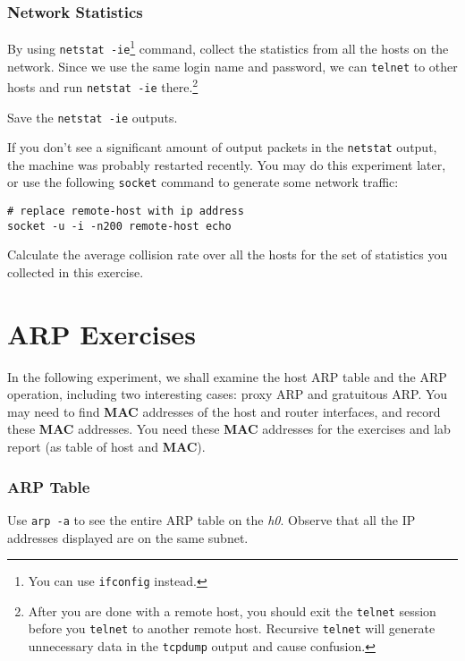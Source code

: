 \documentclass{../UTNetLab}
\begin{document}
\section{Network Statistics}
    By using \lstinline{netstat -ie}\footnote{You can use \lstinline{ifconfig} instead.} command, collect the statistics from all the hosts on the network.
    Since we use the same login name and password, we can \lstinline{telnet} to other hosts and run \lstinline{netstat -ie} there.\footnote{%
    After you are done with a remote host, you should exit the \lstinline{telnet} session before you \lstinline{telnet} to another remote host.
    Recursive \lstinline{telnet} will generate unnecessary data in the \lstinline{tcpdump} output and cause confusion.
    }

    Save the \lstinline{netstat -ie} outputs.

    If you don’t see a significant amount of output packets in the \lstinline{netstat} output, the machine was probably restarted recently.
    You may do this experiment later, or use the following \lstinline{socket} command to generate some network traffic:
    \begin{lstlisting}[emph={remote-host},morekeywords={[3]echo}]
# replace remote-host with ip address
socket -u -i -n200 remote-host echo
    \end{lstlisting}
    
    \begin{report}
        \item Calculate the average collision rate over all the hosts for the set of statistics you collected in this exercise.
    \end{report}

\part{ARP Exercises}
    In the following experiment, we shall examine the host ARP table and the ARP operation, including two interesting cases: proxy ARP and gratuitous ARP.
    You may need to find \textbf{MAC} addresses of the host and router interfaces, and record these \textbf{MAC} addresses.
    You need these \textbf{MAC} addresses for the exercises and lab report (as table of host and \textbf{MAC}).

\section{ARP Table}
    Use \lstinline{arp -a} to see the entire ARP table on the \textit{h0}.
    Observe that all the IP addresses displayed are on the same subnet.
\end{document}
